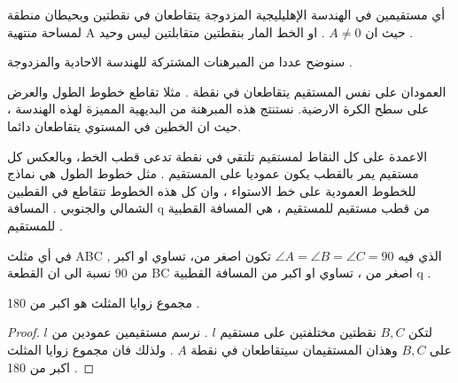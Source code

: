\begin{theorem}
	أي مستقيمين في الهندسة الإهليليجية المزدوجة يتقاطعان في نقطتين ويحيطان منطقة لمساحة منتهية A حيث ان $A \neq 0$ . او الخط المار بنقطتين متقابلتين ليس وحيد .
\end{theorem}

سنوضح عددا من المبرهنات المشتركة للهندسة الاحادية والمزدوجة .

\begin{theorem}
	العمودان على نفس المستقيم يتقاطعان في نقطة . مثلا تقاطع خطوط الطول والعرض على سطح الكرة الارضية.
	نستنتج هذه المبرهنة من البديهية المميزة لهذه الهندسة ، حيث ان الخطين في المستوي يتقاطعان دائما.
\end{theorem}

\begin{theorem}
	الاعمدة على كل النقاط لمستقيم تلتقي في نقطة تدعى قطب الخط، وبالعكس كل مستقيم يمر بالقطب يكون عموديا على المستقيم . مثل خطوط الطول هي نماذج للخطوط العمودية على خط الاستواء ، وان كل هذه الخطوط تتقاطع في القطبين الشمالي والجنوبي .
	المسافة q من قطب مستقيم للمستقيم ، هي المسافة القطبية للمستقيم .
\end{theorem}

\begin{theorem}
	في أي مثلث ABC , الذي فيه $\angle A = \angle B = \angle C = 90$ تكون اصغر من، تساوي او اكبر من 90 نسبة الى ان القطعة BC اصغر من ، تساوي او اكبر من المسافة القطبية q .
\end{theorem}

\begin{theorem}
	مجموع زوايا المثلث هو اكبر من 180 .
\end{theorem}
\begin{proof}
	لتكن \(B,C\) نقطتين مختلفتين على مستقيم \(l\) . نرسم مستقيمين عمودين من \(l\) على \(B,C\) وهذان المستقيمان سيتقاطعان في نقطة \(A\) .
	ولذلك فان مجموع زوايا المثلث اكبر من 180 .
\end{proof}

